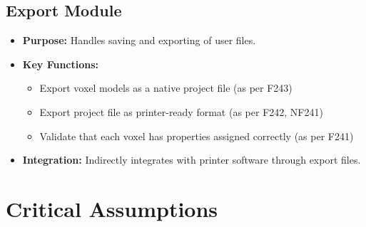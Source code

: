 \documentclass{article}
\begin{document}
\subsection{Export Module}
\begin{itemize}
    \item \textbf{Purpose:} Handles saving and exporting of user files.
    \item \textbf{Key Functions:} 
    \begin{itemize}
        \item Export voxel models as a native project file (as per F243)
        \item Export project file as printer-ready format (as per F242, NF241)
        \item Validate that each voxel has properties assigned correctly (as per F241)
    \end{itemize}
    \item \textbf{Integration:} Indirectly integrates with printer software through export files.
\end{itemize}


\section{Critical Assumptions}



\iffalse
\wss{Include your FMEA table here. This is the most important part of this document.}
\wss{The safety requirements in the table do not have to have the prefix SR.
The most important thing is to show traceability to your SRS. You might trace to
requirements you have already written, or you might need to add new
requirements.}
\wss{If no safety requirement can be devised, other mitigation strategies can be
entered in the table, including strategies involving providing additional
documentation, and/or test cases.}
\fi
\end{document}
